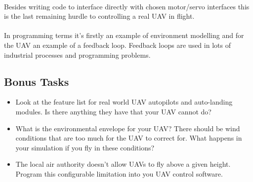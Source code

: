 \documentclass[11pt]{book}
\begin{document}
\paragraph{} Besides writing code to interface directly with chosen motor/servo interfaces this is the last remaining hurdle to controlling a real UAV in flight.

\paragraph{} In programming terms it's firstly an example of environment modelling and for the UAV an example of a feedback loop. Feedback loops are used in lots of industrial processes and programming problems.

\subsection{Bonus Tasks}

\begin{itemize}
\item Look at the feature list for real world UAV autopilots and auto-landing modules. Is there anything they have that your UAV cannot do?
\item What is the environmental envelope for your UAV? There should be wind conditions that are too much for the UAV to correct for. What happens in your simulation if you fly in these conditions?
\item The local air authority doesn't allow UAVs to fly above a given height. Program this configurable limitation into you UAV control software.
\end{itemize}

\clearpage
\end{document}
